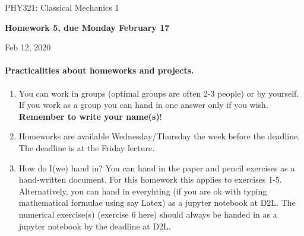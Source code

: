 \documentclass[%
oneside,                 %
final,                   %
10pt]{article}
\begin{document}

\newcommand{\exercisesection}[1]{\subsection*{#1}}






\thispagestyle{empty}

\begin{center}
{\LARGE\bf
\begin{spacing}{1.25}
PHY321: Classical Mechanics 1
\end{spacing}
}
\end{center}


\begin{center}
{\bf Homework 5, due Monday  February 17${}^{}$} \\ [0mm]
\end{center}

\begin{center}
\end{center}
    

\begin{center}
Feb 12, 2020
\end{center}

\vspace{1cm}


\paragraph{Practicalities about  homeworks and projects.}
\begin{enumerate}
\item You can work in groups (optimal groups are often 2-3 people) or by yourself. If you work as a group you can hand in one answer only if you wish. \textbf{Remember to write your name(s)}!

\item Homeworks are available Wednesday/Thursday the week before the deadline. The deadline is at the Friday lecture.

\item How do I(we)  hand in?  You can hand in the paper and pencil exercises as a hand-written document. For this homework this applies to exercises 1-5. Alternatively, you can hand in everyhting (if you are ok with typing mathematical formulae using say Latex) as a jupyter notebook at D2L. The numerical exercise(s) (exercise 6 here) should always be handed in as a jupyter notebook by the deadline at D2L. 
\end{enumerate}
\end{document}
